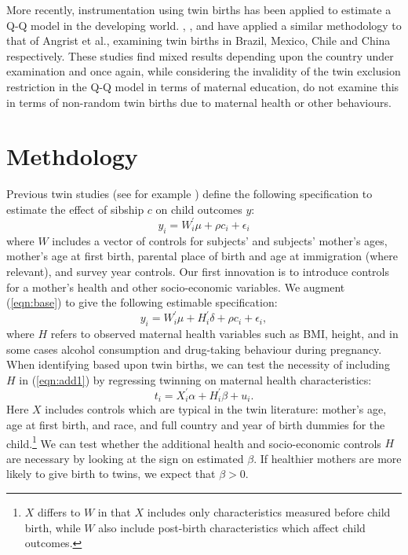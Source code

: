 \documentclass{article}[12pt,subeqn]
\begin{document}
\begin{spacing}{1.5}
More recently, instrumentation using twin births has been applied to estimate a Q-Q model in the developing world. \cite{SouzaPonczek2012}, 
\cite{FitzsimonsMalde2010}, \citet{Sanhueza2009} and \citet{Lietal2008} have applied a similar methodology to that of Angrist et al., 
examining twin births in Brazil, Mexico, Chile and China respectively.  These studies find mixed results depending upon the country under 
examination and once again, while considering the invalidity of the twin exclusion restriction in the Q-Q model in terms of maternal education, 
do not examine this in terms of non-random twin births due to maternal health or other behaviours. 

\section{Methdology}
\label{scn:Methodology}
Previous twin studies (see for example \citet{Angristetal2010}) define the following specification to estimate the effect of sibship $c$ on child outcomes $y$:
\begin{equation}
\label{eqn:base}
y_i=W^\prime_i\mu+\rho c_i + \epsilon_i
\end{equation}
where $W$ includes a vector of controls for subjects' and subjects' mother's ages, mother's age at first birth, parental place of birth and age at immigration (where relevant), and survey year controls.  Our first innovation is to introduce controls for a mother's health and other socio-economic variables.  We augment (\ref{eqn:base}) to give the following estimable specification:
\begin{equation}
\label{eqn:add1}
y_i=W^\prime_i\mu+ H^\prime_i\delta + \rho c_i + \epsilon_i,
\end{equation}
where $H$ refers to observed maternal health variables such as BMI, height, and in some cases alcohol consumption and drug-taking behaviour during pregnancy.  When identifying based upon twin births, we can test the necessity of including $H$ in (\ref{eqn:add1}) by regressing twinning on maternal health characteristics:
\begin{equation}
\label{eqn:twin}
t_i=X^\prime_i\alpha+ H^\prime_i\beta+u_i.
\end{equation}
Here $X$ includes controls which are typical in the twin literature: mother's age, age at first birth, and race, and full country and year of birth dummies for the child.\footnote{$X$ differs to $W$ in that $X$ includes only characteristics measured before child birth, while $W$ also include post-birth characteristics which affect child outcomes.}  We can test whether the additional health and socio-economic controls $H$ are necessary by looking at the sign on estimated $\beta$.  If healthier mothers are more likely to give birth to twins, we expect that $\beta>0$.


\end{spacing}
\end{document}
